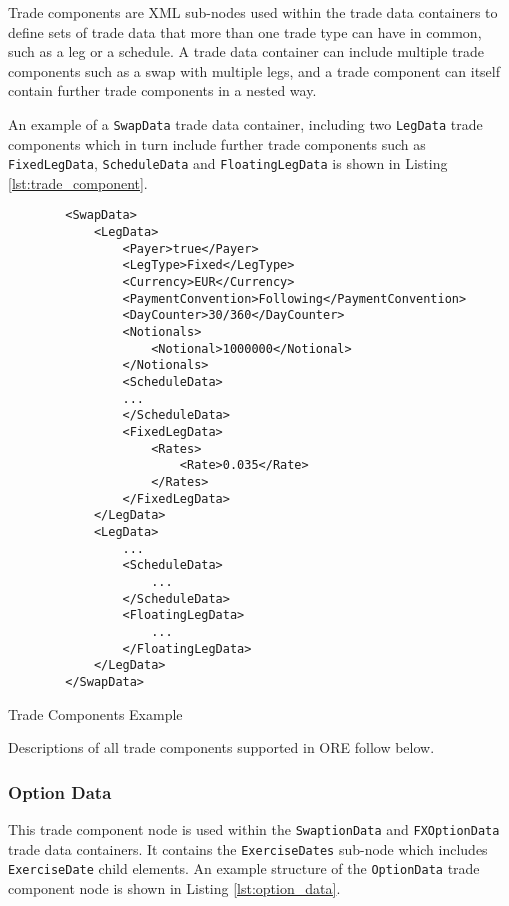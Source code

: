 Trade components are XML sub-nodes used within the trade data containers to define sets of trade data that more than one
trade type can have in common, such as a leg or a schedule. A trade data container can include multiple trade components
such as a swap with multiple legs, and a trade component can itself contain further trade components in a nested way.

\vspace{1em}

An example of a \lstinline!SwapData! trade data container, including two \lstinline!LegData! trade components which in
turn include further trade components such as \lstinline!FixedLegData!, \lstinline!ScheduleData! and
\lstinline!FloatingLegData! is shown in Listing \ref{lst:trade_component}.

\begin{listing}[H]
\begin{verbatim}
        <SwapData>
            <LegData>
                <Payer>true</Payer>
                <LegType>Fixed</LegType>
                <Currency>EUR</Currency>
                <PaymentConvention>Following</PaymentConvention>
                <DayCounter>30/360</DayCounter>
                <Notionals>
                    <Notional>1000000</Notional>
                </Notionals>
                <ScheduleData>
                ...
                </ScheduleData>
                <FixedLegData>
                    <Rates>
                        <Rate>0.035</Rate>
                    </Rates>
                </FixedLegData>
            </LegData>
            <LegData>
                ...
                <ScheduleData>
                    ...
                </ScheduleData>
                <FloatingLegData>
                    ...
                </FloatingLegData>
            </LegData>
        </SwapData>
\end{verbatim}
\caption{Trade Components Example}
\label{lst:trade_component}
\end{listing}

Descriptions of all trade components supported in ORE follow below.

\subsubsection{Option Data}
\label{ss:option_data} 
This trade component node is used within the \lstinline!SwaptionData! and \lstinline!FXOptionData! trade data
containers. It contains the \lstinline!ExerciseDates! sub-node which includes \lstinline!ExerciseDate! child
elements. An example structure of the \lstinline!OptionData! trade component node is shown in Listing
\ref{lst:option_data}.

